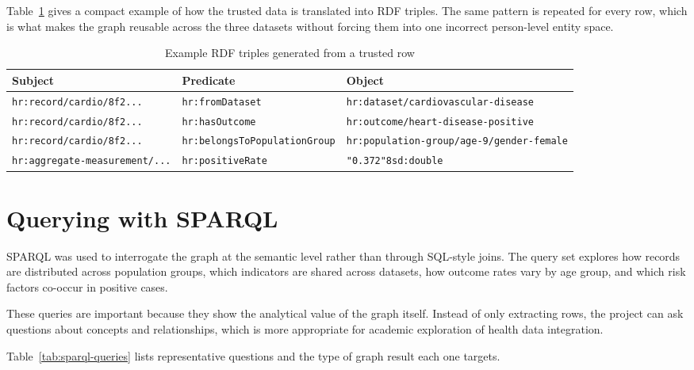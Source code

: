 \documentclass[11pt,a4paper]{article}
\begin{document}
Table~\ref{tab:rdf-example} gives a compact example of how the trusted data is translated into RDF triples. The same pattern is repeated for every row, which is what makes the graph reusable across the three datasets without forcing them into one incorrect person-level entity space.

\begin{table}[ht]
\centering
\begin{tabular}{|l|l|l|}
\hline
\textbf{Subject} & \textbf{Predicate} & \textbf{Object} \\ \hline
\texttt{hr:record/cardio/8f2...} & \texttt{hr:fromDataset} & \texttt{hr:dataset/cardiovascular-disease} \\ \hline
\texttt{hr:record/cardio/8f2...} & \texttt{hr:hasOutcome} & \texttt{hr:outcome/heart-disease-positive} \\ \hline
\texttt{hr:record/cardio/8f2...} & \texttt{hr:belongsToPopulationGroup} & \texttt{hr:population-group/age-9/gender-female} \\ \hline
\texttt{hr:aggregate-measurement/...} & \texttt{hr:positiveRate} & \texttt{"0.372"^^xsd:double} \\ \hline
\end{tabular}
\caption{Example RDF triples generated from a trusted row}
\label{tab:rdf-example}
\end{table}

\section{Querying with SPARQL}
SPARQL was used to interrogate the graph at the semantic level rather than through SQL-style joins. The query set explores how records are distributed across population groups, which indicators are shared across datasets, how outcome rates vary by age group, and which risk factors co-occur in positive cases.

These queries are important because they show the analytical value of the graph itself. Instead of only extracting rows, the project can ask questions about concepts and relationships, which is more appropriate for academic exploration of health data integration.

Table~\ref{tab:sparql-queries} lists representative questions and the type of graph result each one targets.
\end{document}

